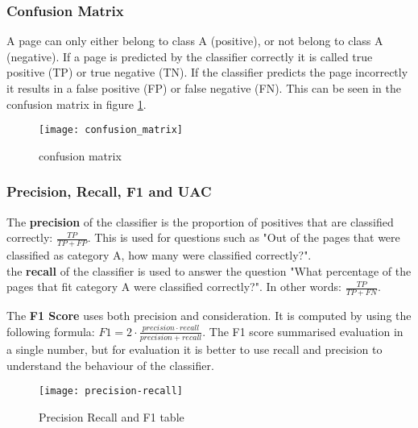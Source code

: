 
\subsubsection{Confusion Matrix}
A page can only either belong to class A (positive), or not belong to class A (negative). If a page is predicted by the classifier correctly it is called true positive (TP) or true negative (TN). If the classifier predicts the page incorrectly it results in a false positive (FP) or false negative (FN). This can be seen in the confusion matrix in figure \ref{fig:confusion_matrix}. 

\begin{figure}[ht]
\centering
\texttt{[image: confusion\_matrix]}
\caption{confusion matrix \protect\footnotemark{}}
\label{fig:confusion_matrix}
\end{figure}


\subsubsection{Precision, Recall, F1 and UAC}\label{sec:classification-validation}
The \textbf{precision} of the classifier is the proportion of positives that are classified correctly: $\frac{TP}{TP+FP}$. This is used for questions such as "Out of the pages that were classified as category A, how many were classified correctly?".\\

the \textbf{recall} of the classifier is used to answer the question "What percentage of the pages that fit category A were classified correctly?". In other words: $\frac{TP}{TP+FN}$.

The \textbf{F1 Score} uses both precision and consideration. It is computed by using the following formula: $F1 = 2\cdot \frac{precision \cdot recall}{precision + recall}$. The F1 score summarised evaluation in a single number, but for evaluation it is better to use recall and precision to understand the behaviour of the classifier. \\

\begin{figure}[ht]
\centering
\texttt{[image: precision-recall]}
\caption{Precision Recall and F1 table}
\label{fig:prec-rec}
\end{figure}

